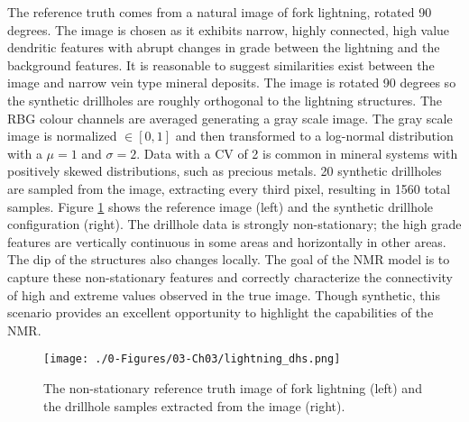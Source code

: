 The reference truth comes from a natural image of fork lightning, rotated 90 degrees. The image is chosen as it exhibits narrow, highly connected, high value dendritic features with abrupt changes in grade between the lightning and the background features. It is reasonable to suggest similarities exist between the image and narrow vein type mineral deposits. The image is rotated 90 degrees so the synthetic drillholes are roughly orthogonal to the lightning structures. The \gls{RBG} colour channels are averaged generating a gray scale image. The gray scale image is normalized $\in [0, 1]$ and then transformed to a log-normal distribution with a $\mu = 1$ and $\sigma = 2$. Data with a \gls{CV} of 2 is common in mineral systems with positively skewed distributions, such as precious metals. 20 synthetic drillholes are sampled from the image, extracting every third pixel, resulting in 1560 total samples. Figure \ref{fig:lightning_dhs} shows the reference image (left) and the synthetic drillhole configuration (right). The drillhole data is strongly non-stationary; the high grade features are vertically continuous in some areas and horizontally in other areas. The dip of the structures also changes locally. The goal of the \gls{NMR} model is to capture these non-stationary features and correctly characterize the connectivity of high and extreme values observed in the true image. Though synthetic, this scenario provides an excellent opportunity to highlight the capabilities of the \gls{NMR}.

\begin{figure}[htb!]
    \centering
    \texttt{[image: ./0-Figures/03-Ch03/lightning\_dhs.png]}
    \caption{The non-stationary reference truth image of fork lightning (left) and the drillhole samples extracted from the image (right). }
    \label{fig:lightning_dhs}
\end{figure}

